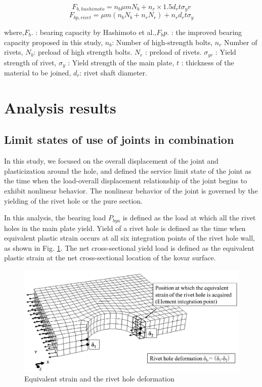 \begin{equation}\label{eq-fbhashi}
    F_{b,hashimoto}=n_b μmN_b + n_r \times 1.5d_r tσ_yr
\end{equation}
\begin{equation}
    F_{bp,rivet}=μm(n_b N_b+n_r N_r)+n_r d_r tσ_y
\end{equation}

where,$F_b.$ : bearing capacity by Hashimoto et al.,$F_bp$. : the improved bearing capacity proposed in this study, $n_b$: Number of high-strength bolts, $n_r$ Number of rivets, $N_b$: preload of high strength bolts. $N_r$ : preload of rivets. $\sigma_{yr}$ : Yield strength of rivet, $σ_y$ : Yield strength of the main plate, $t$ : thickness of the material to be joined, $d_r$: rivet shaft diameter.

\section{Analysis results}

\subsection{Limit states of use of joints in combination}

In this study, we focused on the overall displacement of the joint and plasticization around the hole, and defined the service limit state of the joint as the time when the load-overall displacement relationship of the joint begins to exhibit nonlinear behavior. The nonlinear behavior of the joint is governed by the yielding of the rivet hole or the pure section.

In this analysis, the bearing load $P_{bya}$ is defined as the load at which all the rivet holes in the main plate yield. Yield of a rivet hole is defined as the time when equivalent plastic strain occurs at all six integration points of the rivet hole wall, as shown in Fig. \ref{fig-posieqqe}. The net cross-sectional yield load is defined as the equivalent plastic strain at the net cross-sectional location of the kovar surface.

\begin{figure}[htbp]
    \centering
    \includegraphics[width=0.75\linewidth]{imgs//ch4/posi-eqqe.pdf}
    \caption{Equivalent strain and the rivet hole deformation}
    \label{fig-posieqqe}
\end{figure}

